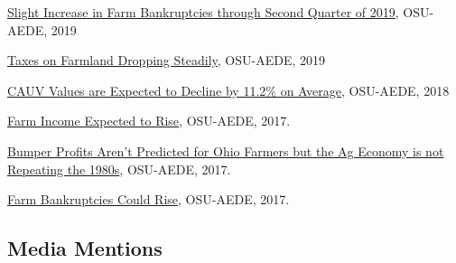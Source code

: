 \documentclass[letterpaper]{article}
\renewenvironment{itemize}{
  \begin{list}{}{
    \setlength{\leftmargin}{1.5em}
  }
}{
  \end{list}
}
\begin{document}
\begin{itemize}
\item \href{https://aede.osu.edu/sites/aede/files/publication_files/BankruptcyUpdate2019Q2.pdf}{Slight Increase in Farm Bankruptcies through Second Quarter of 2019}, OSU-AEDE, 2019
\item \href{https://aede.osu.edu/news/taxes-farmland-dropping-steadily}{Taxes on Farmland Dropping Steadily}, OSU-AEDE, 2019
\item \href{https://aede.osu.edu/news/cauv-values-agricultural-land-are-expected-decline-112-acre-average}{CAUV Values are Expected to Decline by 11.2\% on Average}, OSU-AEDE, 2018
\item \href{https://aede.osu.edu/news/farm-income-expected-rise}{Farm Income Expected to Rise}, OSU-AEDE, 2017.
\item \href{https://aede.osu.edu/news/bumper-profits-arent-predicted-ohio-farmers-ag-economy-not-repeating-1980s}{Bumper Profits Aren't Predicted for Ohio Farmers but the Ag Economy is not Repeating the 1980s}, OSU-AEDE, 2017.
\item \href{https://aede.osu.edu/news/farm-bankruptcies-could-rise}{Farm Bankruptcies Could Rise}, OSU-AEDE, 2017.
\end{itemize}

\subsection*{Media Mentions}
\end{document}
